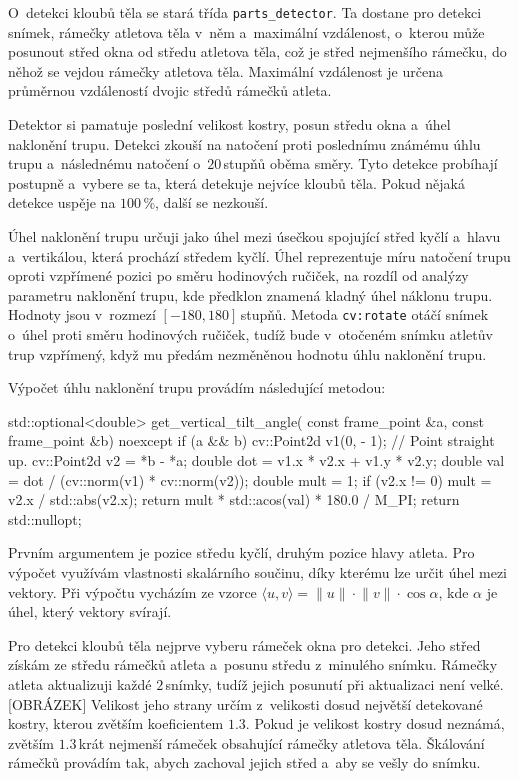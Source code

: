 O~detekci kloubů těla se stará třída \texttt{parts\_detector}. Ta dostane pro detekci snímek, rámečky atletova těla v~něm a~maximální vzdálenost, o~kterou může posunout střed okna od středu atletova těla, což je střed nejmenšího rámečku, do něhož se vejdou rámečky atletova těla. Maximální vzdálenost je určena průměrnou vzdáleností dvojic středů rámečků atleta.

Detektor si pamatuje poslední velikost kostry, posun středu okna a~úhel naklonění trupu. Detekci zkouší na natočení proti poslednímu známému úhlu trupu a~následnému natočení o~$20$\,\rm stupňů oběma směry. Tyto detekce probíhají postupně a~vybere se ta, která detekuje nejvíce kloubů těla. Pokud nějaká detekce uspěje na $100$\,\rm \%, další se nezkouší.

Úhel naklonění trupu určuji jako úhel mezi úsečkou spojující střed kyčlí a~hlavu a~vertikálou, která prochází středem kyčlí. Úhel reprezentuje míru natočení trupu oproti vzpřímené pozici po směru hodinových ručiček, na rozdíl od analýzy parametru naklonění trupu, kde předklon znamená kladný úhel náklonu trupu. Hodnoty jsou v~rozmezí $[-180,180]$\,\rm stupňů. Metoda \texttt{cv\::rotate} otáčí snímek o~úhel proti směru hodinových ručiček, tudíž bude v~otočeném snímku atletův trup vzpřímený, když mu předám nezměněnou hodnotu úhlu naklonění trupu.

Výpočet úhlu naklonění trupu provádím následující metodou:
\begin{code}[fontsize=\footnotesize]
std::optional<double> get_vertical_tilt_angle(
    const frame_point &a,
    const frame_point &b) noexcept {
        if (a && b) {
            cv::Point2d v1(0, - 1); // Point straight up.
            cv::Point2d v2 = *b - *a;
            double dot = v1.x * v2.x + v1.y * v2.y;
            double val = dot / (cv::norm(v1) * cv::norm(v2));
            double mult = 1;
            if (v2.x != 0)
                mult = v2.x / std::abs(v2.x);
            return mult * std::acos(val) * 180.0 / M_PI;
        }
        return std::nullopt;
}
\end{code}
Prvním argumentem je pozice středu kyčlí, druhým pozice hlavy atleta. Pro výpočet využívám vlastnosti skalárního součinu, díky kterému lze určit úhel mezi vektory. Při výpočtu vycházím ze vzorce $\langle u,v\rangle=\lVert u\rVert\cdot\lVert v\rVert\cdot\cos\alpha$, kde $\alpha$ je úhel, který vektory svírají.

Pro detekci kloubů těla nejprve vyberu rámeček okna pro detekci. Jeho střed získám ze středu rámečků atleta a~posunu středu z~minulého snímku. Rámečky atleta aktualizuji každé $2$\,\rm snímky, tudíž jejich posunutí při aktualizaci není velké. [OBRÁZEK] Velikost jeho strany určím z~velikosti dosud největší detekované kostry, kterou zvětším koeficientem $1.3$. Pokud je velikost kostry dosud neznámá, zvětším $1.3$\,\rm krát nejmenší rámeček obsahující rámečky atletova těla. Škálování rámečků provádím tak, abych zachoval jejich střed a~aby se vešly do snímku.

